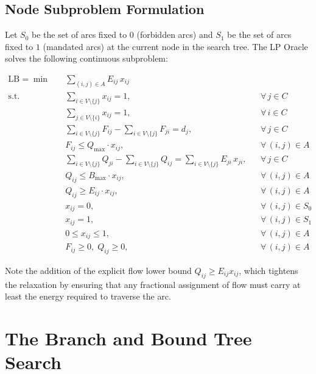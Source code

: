 \documentclass[11pt,a4paper]{article}
\begin{document}
\subsection{Node Subproblem Formulation}
Let $S_0$ be the set of arcs fixed to $0$ (forbidden arcs) and $S_1$ be the set of arcs fixed to $1$ (mandated arcs) at the current node in the search tree. The LP Oracle solves the following continuous subproblem:

\begin{align}
  \text{LB} = \min \quad & \sum_{(i,j) \in A} E_{ij} \, x_{ij} \\[6pt]
  \text{s.t.} \quad 
  & \sum_{i \in V \setminus \{j\}} x_{ij} = 1, && \forall\, j \in C \\
  & \sum_{j \in V \setminus \{i\}} x_{ij} = 1, && \forall\, i \in C \\
  & \sum_{i \in V \setminus \{j\}} F_{ij} - \sum_{i \in V \setminus \{j\}} F_{ji} = d_j, && \forall\, j \in C \\
  & F_{ij} \le Q_{\max} \cdot x_{ij}, && \forall\, (i,j) \in A \\
  & \sum_{i \in V \setminus \{j\}} Q_{ji} - \sum_{i \in V \setminus \{j\}} Q_{ij} = \sum_{i \in V \setminus \{j\}} E_{ji} \, x_{ji}, && \forall\, j \in C \\
  & Q_{ij} \le B_{\max} \cdot x_{ij}, && \forall\, (i,j) \in A \\
  & Q_{ij} \ge E_{ij} \cdot x_{ij}, && \forall\, (i,j) \in A \\
  & x_{ij} = 0, && \forall\, (i,j) \in S_0 \\
  & x_{ij} = 1, && \forall\, (i,j) \in S_1 \\
  & 0 \le x_{ij} \le 1, && \forall\, (i,j) \in A \\
  & F_{ij} \ge 0,\; Q_{ij} \ge 0, && \forall\, (i,j) \in A
\end{align}

Note the addition of the explicit flow lower bound $Q_{ij} \ge E_{ij} x_{ij}$, which tightens the relaxation by ensuring that any fractional assignment of flow must carry at least the energy required to traverse the arc.

\section{The Branch and Bound Tree Search}
\end{document}
